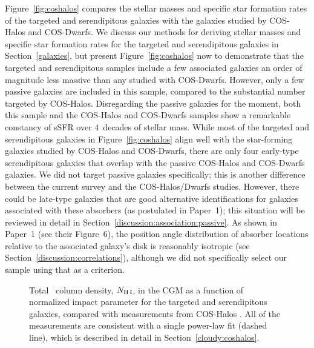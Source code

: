 \documentclass[twocolumn,twocolappendix,tighten,times]{aastex6}
\newcommand{\HI}{\ion{H}{1}}
\begin{document}
Figure~\ref{fig:coshalos} compares the stellar masses and specific 
star formation rates of the targeted and serendipitous galaxies with the 
galaxies studied by COS-Halos and COS-Dwarfs. We discuss our methods for deriving 
stellar masses and specific star formation rates for the targeted and 
serendipitous galaxies in Section~\ref{galaxies}, but present 
Figure~\ref{fig:coshalos} now to demonstrate that the targeted and serendipitous 
samples include a few associated galaxies an order of magnitude less massive than 
any studied with COS-Dwarfs. However, only a few passive galaxies are
included in this sample, compared to the substantial number targeted by COS-Halos. 
Disregarding the passive galaxies for the moment, both this sample and the 
COS-Halos and COS-Dwarfs samples show a remarkable constancy of sSFR over 
4~decades of stellar mass. While most of the targeted and serendipitous galaxies 
in Figure~\ref{fig:coshalos} align well with the star-forming galaxies studied by 
COS-Halos and COS-Dwarfs, there are only four early-type serendipitous galaxies 
that overlap with the passive COS-Halos and COS-Dwarfs galaxies. We did not target 
passive galaxies specifically; this is another difference between the current 
survey and the COS-Halos/Dwarfs studies. However, there could be late-type 
galaxies that are good alternative identifications for galaxies associated with 
these absorbers (as postulated in Paper~1); this situation will be reviewed in 
detail in Section~\ref{discussion:association:passive}. As shown in Paper~1 (see 
their Figure~6), the position angle distribution of absorber locations relative to 
the associated galaxy's disk is reasonably isotropic (see 
Section~\ref{discussion:correlations}), although we did not specifically select 
our sample using that as a criterion.


\begin{figure}[!t]
\caption{Total \HI\ column density, $N_{\rm H\,I}$, in the CGM as a function of normalized impact parameter for the targeted and serendipitous galaxies, compared with measurements from COS-Halos \citep{werk14}. All of the measurements are consistent with a single power-law fit (dashed line), which is described in detail in Section~\ref{cloudy:coshalos}.
\label{fig:N_HI}}
\end{figure}
\end{document}
